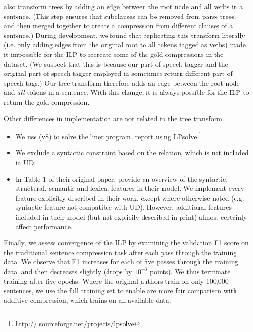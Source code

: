 \citet{filippova2013overcoming} also transform trees by adding an edge between the root node and all verbs in a sentence. (This step ensures that subclauses can be removed from parse trees, and then merged together to create a compression from different clauses of a sentence.) During development, we found that replicating this transform literally (i.e. only adding edges from the original root to all tokens tagged as verbs) made it impossible for the ILP to recreate some of the gold compressions in the dataset. (We suspect that this is because our part-of-speech tagger and the original part-of-speech tagger employed in \citet{filippova2013overcoming} sometimes return different part-of-speech tags.) Our tree transform therefore adds an edge between the root node and \textit{all} tokens in a sentence. With this change, it is always possible for the ILP to return the gold compression.

Other differences in implementation are not related to the tree transform.

\begin{itemize}
\item{We use \citet{gurobi} (v8) to solve the liner program. \citet{filippova2008dependency} report using LPsolve.\footnote{\url{http://
sourceforge.net/projects/lpsolve}}}
\item{We exclude a syntactic constraint based on the  relation, which is not included in UD.}
\item{In Table 1 of their original paper, \citet{filippova2013overcoming} provide an overview of the syntactic, structural, semantic and lexical features in their model. We implement every feature explicitly described in their work, except where otherwise noted (e.g. syntactic feature not compatible with UD). However, additional features included in their model (but not explicily described in print) almost certainly affect performance.}
\end{itemize}

Finally, we assess convergence of the ILP by examining the validation F1 score on the traditional sentence compression task after each pass through the training data. We observe that F1 increases for each of five passes through the training data, and then decreases slightly (drops by $10^{-3}$ points). We thus terminate training after five epochs. Where the original authors train on only 100,000 sentences, we use the full training set to enable are more fair comparison with additive compression, which trains on all available data.

